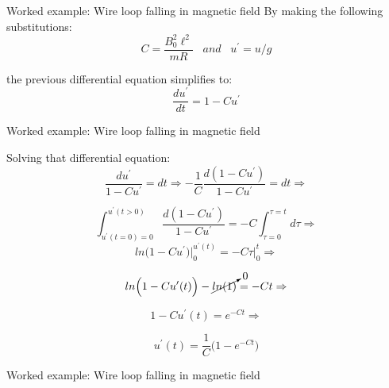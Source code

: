 {\begin{frame}{Worked example: Wire loop falling in magnetic field}
  By making the following substitutions:
  \begin{equation*}
    C = \frac{B_0^2 \ell^2}{mR} \;\;\; and \;\;\; u^{\prime} = u/g
  \end{equation*}

  the previous differential equation simplifies to:
  \begin{equation*}
    \frac{du^{\prime}}{dt} = 1 - C u^{\prime}
    \label{eq:p3c_u_diffeq2}
  \end{equation*}

\end{frame}

%
%
%

\begin{frame}{Worked example: Wire loop falling in magnetic field}

  Solving that differential equation:
  \begin{equation*}
    \frac{du^{\prime}}{1-Cu^{\prime}} = dt \Rightarrow
   -\frac{1}{C} \frac{d(1-Cu^{\prime})}{1-Cu^{\prime}} = dt \Rightarrow
  \end{equation*}

  \begin{equation*}
    \int_{u^{\prime}(t=0)=0}^{u^{\prime}(t>0)}
      \frac{d(1-Cu^{\prime})}{1-Cu^{\prime}} =
     -C \int_{\tau=0}^{\tau=t} d\tau \Rightarrow
   \end{equation*}
   \begin{equation*}
      ln\Big(1-Cu^{\prime}\Big) \Bigg\rvert_{0}^{u^{\prime}(t)}
      = -C \tau \Bigg\rvert_{0}^{t} \Rightarrow
  \end{equation*}

  \begin{equation*}
    ln\Big(1-Cu^{\prime}(t)\Big) - \cancelto{0}{ln(1)} = -C t \Rightarrow
  \end{equation*}

  \begin{equation*}
    1-Cu^{\prime}(t) = e^{-Ct} \Rightarrow
  \end{equation*}

  \begin{equation*}
    u^{\prime}(t) = \frac{1}{C} \Big( 1-e^{-Ct} \Big)
  \end{equation*}

\end{frame}

%
%
%

\begin{frame}{Worked example: Wire loop falling in magnetic field}


\end{frame}}
